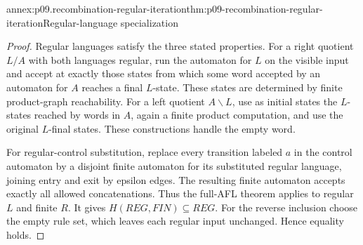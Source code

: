 \begin{annexitem}{annex:p09.recombination-regular-iteration}{thm:p09-recombination-regular-iteration}{Regular-language specialization}
\begin{proof}
Regular languages satisfy the three stated properties.
For a right quotient \(L/A\) with both languages regular, run the automaton
for \(L\) on the visible input and accept at exactly those states from which
some word accepted by an automaton for \(A\) reaches a final \(L\)-state.
These states are determined by finite product-graph reachability.
For a left quotient \(A\backslash L\), use as initial states the
\(L\)-states reached by words in \(A\), again a finite product computation,
and use the original \(L\)-final states. These constructions handle the
empty word.

For regular-control substitution, replace every transition labeled \(a\)
in the control automaton by a disjoint finite automaton for its substituted
regular language, joining entry and exit by epsilon edges.
The resulting finite automaton accepts exactly all allowed concatenations.
Thus the full-AFL theorem applies to regular \(L\) and finite \(R\).
It gives \(H(REG,FIN)\subseteq REG\).
For the reverse inclusion choose the empty rule set, which leaves each
regular input unchanged. Hence equality holds.
\end{proof}
\end{annexitem}

